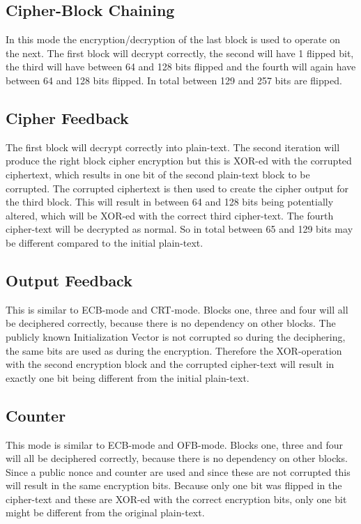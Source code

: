 \documentclass{article}
\begin{document}
\subsection{Cipher-Block Chaining}
In this mode the encryption/decryption of the last block is used to operate on the next.
The first block will decrypt correctly, the second will have 1 flipped bit, the third will have between 64 and 128 bits flipped and the fourth will again have between 64 and 128 bits flipped.
In total between 129 and 257 bits are flipped.

\subsection{Cipher Feedback}
The first block will decrypt correctly into plain-text.
The second iteration will produce the right block cipher encryption but this is XOR-ed with the corrupted ciphertext, which results in one bit of the second plain-text block to be corrupted.
The corrupted ciphertext is then used to create the cipher output for the third block.
This will result in between 64 and 128 bits being potentially altered, which will be XOR-ed with the correct third cipher-text.
The fourth cipher-text will be decrypted as normal.
So in total between 65 and 129 bits may be different compared to the initial plain-text.

\subsection{Output Feedback}
This is similar to ECB-mode and CRT-mode.
Blocks one, three and four will all be deciphered correctly, because there is no dependency on other blocks.
The publicly known Initialization Vector is not corrupted so during the deciphering, the same bits are used as during the encryption.
Therefore the XOR-operation with the second encryption block and the corrupted cipher-text will result in exactly one bit being different from the initial plain-text.

\subsection{Counter}
This mode is similar to ECB-mode and OFB-mode.
Blocks one, three and four will all be deciphered correctly, because there is no dependency on other blocks.
Since a public nonce and counter are used and since these are not corrupted this will result in the same encryption bits.
Because only one bit was flipped in the cipher-text and these are XOR-ed with the correct encryption bits, only one bit might be different from the original plain-text.


%
% 
\end{document}
